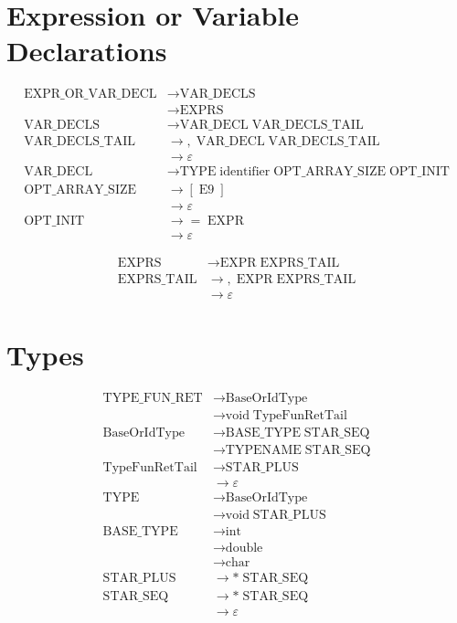 \section{Expression or Variable Declarations}
\begin{align*}
\text{EXPR\_OR\_VAR\_DECL}
  &\to \text{VAR\_DECLS}\\
  &\to \text{EXPRS}\\[6pt]
\text{VAR\_DECLS}
  &\to \text{VAR\_DECL}\;\text{VAR\_DECLS\_TAIL}\\[6pt]
\text{VAR\_DECLS\_TAIL}
  &\to ,\;\text{VAR\_DECL}\;\text{VAR\_DECLS\_TAIL}\\
  &\to \varepsilon\\[6pt]
\text{VAR\_DECL}
  &\to \text{TYPE}\;\text{identifier}\;\text{OPT\_ARRAY\_SIZE}\;\text{OPT\_INIT}\\[6pt]
\text{OPT\_ARRAY\_SIZE}
  &\to [\;\text{E9}\;]\\
  &\to \varepsilon\\[6pt]
\text{OPT\_INIT}
  &\to =\;\text{EXPR}\\
  &\to \varepsilon
\end{align*}

\begin{align*}
\text{EXPRS}
  &\to \text{EXPR}\;\text{EXPRS\_TAIL}\\[6pt]
\text{EXPRS\_TAIL}
  &\to ,\;\text{EXPR}\;\text{EXPRS\_TAIL}\\
  &\to \varepsilon
\end{align*}

\section{Types}
\begin{align*}
\text{TYPE\_FUN\_RET}
  &\to \text{BaseOrIdType}\\
  &\to \text{void}\;\text{TypeFunRetTail}\\[6pt]
\text{BaseOrIdType}
  &\to \text{BASE\_TYPE}\;\text{STAR\_SEQ}\\
  &\to \text{TYPENAME}\;\text{STAR\_SEQ}\\[6pt]
\text{TypeFunRetTail}
  &\to \text{STAR\_PLUS}\\
  &\to \varepsilon\\[6pt]
\text{TYPE}
  &\to \text{BaseOrIdType}\\
  &\to \text{void}\;\text{STAR\_PLUS}\\[6pt]
\text{BASE\_TYPE}
  &\to \text{int}\\
  &\to \text{double}\\
  &\to \text{char}\\[6pt]
\text{STAR\_PLUS}
  &\to *\;\text{STAR\_SEQ}\\[6pt]
\text{STAR\_SEQ}
  &\to *\;\text{STAR\_SEQ}\\
  &\to \varepsilon
\end{align*}


